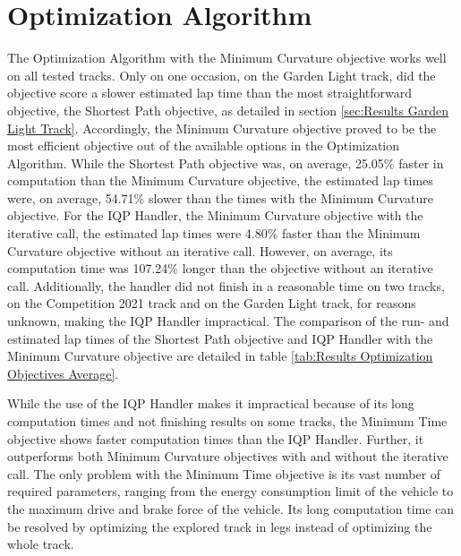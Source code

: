 \section{Optimization Algorithm}
The Optimization Algorithm with the Minimum Curvature objective works well on all tested tracks. Only on one occasion, on the Garden Light track, did the objective score a slower estimated lap time than the most straightforward objective, the Shortest Path objective, as detailed in section \ref{sec:Results Garden Light Track}. Accordingly, the Minimum Curvature objective proved to be the most efficient objective out of the available options in the Optimization Algorithm. While the Shortest Path objective was, on average, 25.05\% faster in computation than the Minimum Curvature objective, the estimated lap times were, on average, 54.71\% slower than the times with the Minimum Curvature objective. For the IQP Handler, the Minimum Curvature objective with the iterative call, the estimated lap times were 4.80\% faster than the Minimum Curvature objective without an iterative call. However, on average, its computation time was 107.24\% longer than the objective without an iterative call. Additionally, the handler did not finish in a reasonable time on two tracks, on the Competition 2021 track and on the Garden Light track, for reasons unknown, making the IQP Handler impractical. The comparison of the run- and estimated lap times of the Shortest Path objective and IQP Handler with the Minimum Curvature objective are detailed in table \ref{tab:Results Optimization Objectives Average}.

While the use of the IQP Handler makes it impractical because of its long computation times and not finishing results on some tracks, the Minimum Time objective shows faster computation times than the IQP Handler. Further, it outperforms both Minimum Curvature objectives with and without the iterative call. The only problem with the Minimum Time objective is its vast number of required parameters, ranging from the energy consumption limit of the vehicle to the maximum drive and brake force of the vehicle. Its long computation time can be resolved by optimizing the explored track in legs instead of optimizing the whole track.

